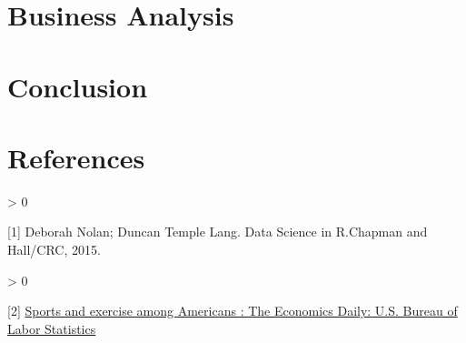 \documentclass[
]{article}
\newlength{\cslhangindent}
\newenvironment{CSLReferences}[2] %
 {%
  \setlength{\parindent}{0pt}
  \ifodd #1 \everypar{\setlength{\hangindent}{\cslhangindent}}\ignorespaces\fi
  \ifnum #2 > 0
  \setlength{\parskip}{#2\baselineskip}
  \fi
 }%
 {}
\begin{document}
\newpage

\hypertarget{business-analysis}{%
\section{Business Analysis}\label{business-analysis}}

\newpage

\hypertarget{conclusion}{%
\section{Conclusion}\label{conclusion}}

\hypertarget{references}{%
\section*{References}\label{references}}

\leavevmode\hypertarget{refs}{}%
\begin{CSLReferences}{0}{0}
{[}1{]} Deborah Nolan; Duncan Temple Lang. Data Science in R.Chapman and
Hall/CRC, 2015.

\end{CSLReferences}

\leavevmode\hypertarget{refs}{}%
\begin{CSLReferences}{0}{0}
{[}2{]}
\href{https://www.bls.gov/opub/ted/2016/sports-and-exercise-among-americans.htm}{Sports
and exercise among Americans : The Economics Daily: U.S. Bureau of Labor
Statistics}

\end{CSLReferences}
\end{document}
